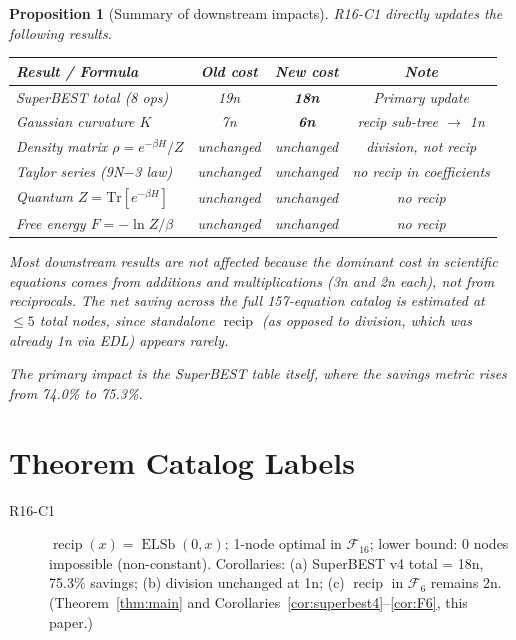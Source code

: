 \documentclass[12pt,a4paper]{article}
\newtheorem{proposition}[theorem]{Proposition}
\theoremstyle{definition}
\newcommand{\ELSb}{\operatorname{ELSb}}
\newcommand{\recip}{\operatorname{recip}}
\begin{document}
\begin{proposition}[Summary of downstream impacts]
\label{prop:ripple}
R16-C1 directly updates the following results.

\smallskip
\begin{center}
\begin{tabular}{@{}lccc@{}}
\toprule
\textbf{Result / Formula} & \textbf{Old cost} & \textbf{New cost} & \textbf{Note} \\
\midrule
SuperBEST total (8 ops)    & 19n & \textbf{18n} & Primary update \\
Gaussian curvature $K$     & 7n  & \textbf{6n}  & recip sub-tree $\to$ 1n \\
Density matrix $\rho = e^{-\beta H}/Z$ & unchanged & unchanged & division, not recip \\
Taylor series (9N$-$3 law) & unchanged & unchanged & no recip in coefficients \\
Quantum $Z = \mathrm{Tr}[e^{-\beta H}]$ & unchanged & unchanged & no recip \\
Free energy $F = -\ln Z/\beta$ & unchanged & unchanged & no recip \\
\bottomrule
\end{tabular}
\end{center}

\smallskip
\noindent
Most downstream results are \emph{not} affected because the dominant
cost in scientific equations comes from additions and multiplications
(3n and 2n each), not from reciprocals.  The net saving across the
full 157-equation catalog is estimated at $\leq 5$ total nodes, since
standalone $\recip$ (as opposed to division, which was already 1n via EDL)
appears rarely.

The primary impact is the SuperBEST table itself, where the savings
metric rises from 74.0\% to 75.3\%.
\end{proposition}

\section*{Theorem Catalog Labels}

\begin{description}
  \item[R16-C1]
    $\recip(x) = \ELSb(0,x)$; 1-node optimal in $\mathcal{F}_{16}$;
    lower bound: 0 nodes impossible (non-constant).
    Corollaries: (a) SuperBEST v4 total = 18n, 75.3\% savings;
    (b) division unchanged at 1n; (c) $\recip$ in $\mathcal{F}_6$ remains 2n.
    (Theorem~\ref{thm:main} and Corollaries~\ref{cor:superbest4}--\ref{cor:F6},
    this paper.)
\end{description}
\end{document}
